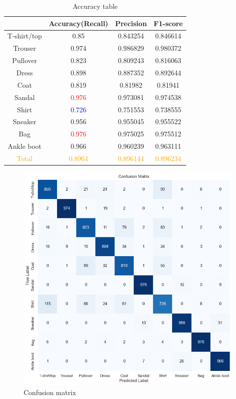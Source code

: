 \documentclass[10pt,a4paper,twoside]{tau}
\begin{document}
\begin{table}[htbp]
\centering
\begin{tabular}{|c|c|c|c|}
    \hline
                &   Accuracy(Recall) &   Precision &   F1-score \\ \hline
    T-shirt/top &             0.85   &  0.843254   &   0.846614 \\ \hline
    Trouser     &             0.974  &  0.986829   &   0.980372 \\ \hline
    Pullover    &             0.823  &  0.809243   &   0.816063 \\ \hline
    Dress       &             0.898  &  0.887352   &   0.892644 \\ \hline
    Coat        &             0.819  &  0.81982    &   0.81941  \\ \hline
    Sandal      &             \textcolor{red}{0.976}  &  0.973081   &   0.974538 \\ \hline
    Shirt       &             \textcolor{blue}{0.726}  &  0.751553   &   0.738555 \\ \hline
    Sneaker     &             0.956  &  0.955045   &   0.955522 \\ \hline
    Bag         &             \textcolor{red}{0.976}  &  0.975025   &   0.975512 \\ \hline
    Ankle boot  &             0.966  &  0.960239   &   0.963111 \\ \hline
    \textcolor{orange}{Total}       &  \textcolor{orange}{0.8964}  &  \textcolor{orange}{0.896144}   &   \textcolor{orange}{0.896234} \\ \hline
\end{tabular}
\caption{Accuracy table}
\label{tab:accuracy-table}
\end{table}

\begin{figure}[htbp]
\centering
\includegraphics[scale=0.38]{images/confusion_matrix.png}
\caption{Confusion matrix}
\label{fig:confusion-matrix}
\end{figure}
\end{document}
